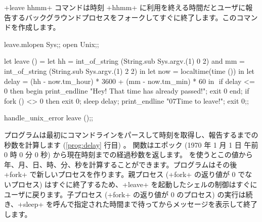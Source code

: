 \ml+leave hhmm+ コマンドは時刻 \ml+hhmm+ に利用を終える時間だとユーザに報告するバックグラウンドプロセスをフォークしてすぐに終了します。このコマンドを作成します。
%
\begin{listingcodefile}[style=numbers]{leave.ml}open Sys;;
open Unix;;

let leave () =
 let hh = int_of_string (String.sub Sys.argv.(1) 0 2)
 and mm = int_of_string (String.sub Sys.argv.(1) 2 2) in
 let now = localtime(time ()) in
 let delay = (hh - now.tm_hour) * 3600 + (mm - now.tm_min) * 60 in
$\label{prog:delay}$
 if delay <= 0 then begin
   print_endline "Hey! That time has already passed!";
   exit 0
 end;
 if fork () <> 0 then exit 0;
 sleep delay;
 print_endline "\007Time to leave!";
 exit 0;;

handle_unix_error leave ();;
\end{listingcodefile}
%
プログラムは最初にコマンドラインをパースして時刻を取得し、報告するまでの秒数を計算します (\ref{prog:delay} 行目) 。 関数はエポック (1970 年 1 月 1 日 午前 0 時 0 分 0 秒) から現在時刻までの経過秒数を返します。  を使うとこの値から年、月、日、時、分、秒を計算することができます。プログラムはその後 \ml+fork+ で新しいプロセスを作ります。親プロセス (\ml+fork+ の返り値が 0 でないプロセス) はすぐに終了するため、\ml+leave+ を起動したシェルの制御はすぐにユーザに戻ります。子プロセス (\ml+fork+ の返り値が 0 のプロセス) の実行は続き、\ml+sleep+ を呼んで指定された時間まで待ってからメッセージを表示して終了します。

